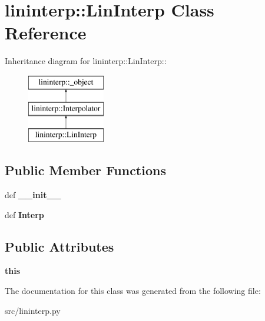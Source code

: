 \hypertarget{classlininterp_1_1LinInterp}{
\section{lininterp::LinInterp Class Reference}
\label{db/da6/classlininterp_1_1LinInterp}
}
Inheritance diagram for lininterp::LinInterp::\begin{figure}[H]
\begin{center}
\leavevmode
\includegraphics[height=3cm]{db/da6/classlininterp_1_1LinInterp}
\end{center}
\end{figure}
\subsection*{Public Member Functions}
\begin{DoxyCompactItemize}
\item 
\hypertarget{classlininterp_1_1LinInterp_ac3e5644b61ba0c4a406e5b9c4df73015}{
def {\bfseries \_\-\_\-init\_\-\_\-}}
\label{db/da6/classlininterp_1_1LinInterp_ac3e5644b61ba0c4a406e5b9c4df73015}

\item 
\hypertarget{classlininterp_1_1LinInterp_a2a0d4d4f60b4266c7c69307d5f8a03df}{
def {\bfseries Interp}}
\label{db/da6/classlininterp_1_1LinInterp_a2a0d4d4f60b4266c7c69307d5f8a03df}

\end{DoxyCompactItemize}
\subsection*{Public Attributes}
\begin{DoxyCompactItemize}
\item 
\hypertarget{classlininterp_1_1LinInterp_a2991116f7ec800a41b328bd1c4e71e6e}{
{\bfseries this}}
\label{db/da6/classlininterp_1_1LinInterp_a2991116f7ec800a41b328bd1c4e71e6e}

\end{DoxyCompactItemize}


The documentation for this class was generated from the following file:\begin{DoxyCompactItemize}
\item 
src/lininterp.py\end{DoxyCompactItemize}
